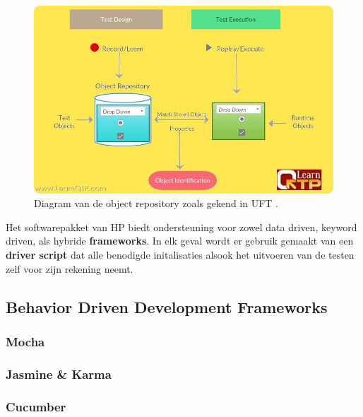 \begin{figure}[h!]
    \centering
    \includegraphics[scale=0.4]{img/LearnQTP2017GuideToObjectRepositoryInUft.jpg}
    \caption{Diagram van de object repository zoals gekend in UFT \autocite{LearnQTP2017ObjectRepo}.}
    \label{fig:utfobjectrepo}
\end{figure}

Het softwarepakket van HP biedt ondersteuning voor zowel data driven, keyword driven, als hybride \textbf{frameworks}. In elk geval wordt er gebruik gemaakt van een \textbf{driver script} dat alle benodigde initalisaties alsook het uitvoeren van de testen zelf voor zijn rekening neemt. \autocite{TutorialsPointDesigningFramework,TutorialsPointFrameworks,Guru99FrameworksInQTP}

\subsection{Behavior Driven Development Frameworks}

\lipsum[9]

\subsubsection{Mocha}

\lipsum[8-9]

\subsubsection{Jasmine \& Karma}

\lipsum[8-9]

\subsubsection{Cucumber}

\lipsum[8-9]